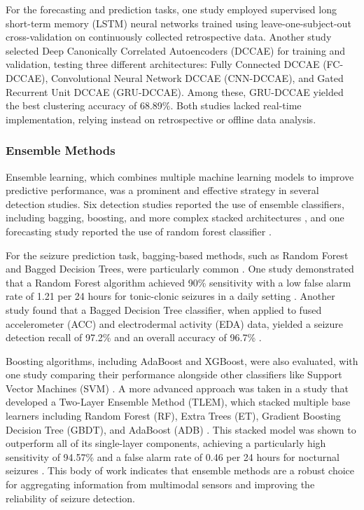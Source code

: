 For the forecasting and prediction tasks, one study \cite{Meisel2020-ii} employed supervised long short-term memory (LSTM) neural networks trained using leave-one-subject-out cross-validation on continuously collected retrospective data. Another study \cite{Vieluf2023-ta} selected Deep Canonically Correlated Autoencoders (DCCAE) for training and validation, testing three different architectures: Fully Connected DCCAE (FC-DCCAE), Convolutional Neural Network DCCAE (CNN-DCCAE), and Gated Recurrent Unit DCCAE (GRU-DCCAE). Among these, GRU-DCCAE yielded the best clustering accuracy of 68.89\%. Both studies lacked real-time implementation, relying instead on retrospective or offline data analysis.


\subsubsection{Ensemble Methods}
Ensemble learning, which combines multiple machine learning models to improve predictive performance, was a prominent and effective strategy in several detection studies. Six detection studies reported the use of ensemble classifiers, including bagging, boosting, and more complex stacked architectures \cite{Wang2022-lt, Chowdhury2022-bi, Vakilna2024-hk, Dong2022-oo, Jiang2022-zu, Wu2024-yl}, and one forecasting study reported the use of random forest classifier \cite{Vieluf2023-zv}.

For the seizure prediction task, bagging-based methods, such as Random Forest and Bagged Decision Trees, were particularly common \cite{Chowdhury2022-bi, Wang2022-lt, Wu2024-yl, Vakilna2024-hk}. One study demonstrated that a Random Forest algorithm achieved 90\% sensitivity with a low false alarm rate of 1.21 per 24 hours for tonic-clonic seizures in a daily setting \cite{Wang2022-lt}. Another study found that a Bagged Decision Tree classifier, when applied to fused accelerometer (ACC) and electrodermal activity (EDA) data, yielded a seizure detection recall of 97.2\% and an overall accuracy of 96.7\% \cite{Chowdhury2022-bi}.

Boosting algorithms, including AdaBoost and XGBoost, were also evaluated, with one study comparing their performance alongside other classifiers like Support Vector Machines (SVM) \cite{Xu2022-tx}. A more advanced approach was taken in a study that developed a Two-Layer Ensemble Method (TLEM), which stacked multiple base learners including Random Forest (RF), Extra Trees (ET), Gradient Boosting Decision Tree (GBDT), and AdaBoost (ADB) \cite{Dong2022-oo}. This stacked model was shown to outperform all of its single-layer components, achieving a particularly high sensitivity of 94.57\% and a false alarm rate of 0.46 per 24 hours for nocturnal seizures \cite{Dong2022-oo}. This body of work indicates that ensemble methods are a robust choice for aggregating information from multimodal sensors and improving the reliability of seizure detection.

